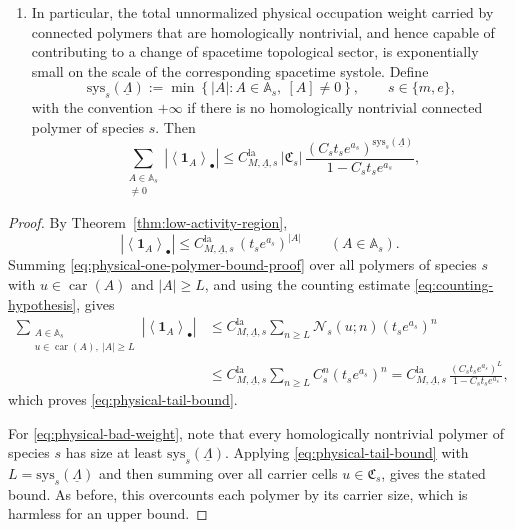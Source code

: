 \begin{corollary}
\begin{enumerate}[label=(\roman*)]
		\item\label{corItem:homological-tail}
		In particular, the total unnormalized physical occupation weight carried by connected
		polymers that are homologically nontrivial, and hence capable of contributing to a
		change of spacetime topological sector, is exponentially small on the scale of the
		corresponding spacetime systole. Define
		\begin{equation}
			\mathrm{sys}_s(\underline\Lambda)
			:=
			\min\left\{
			|A|:
			A\in\mathbb A_s,\ [A]\neq 0
			\right\},
			\qquad s\in\{m,e\},
			\label{eq:systole}
		\end{equation}
		with the convention \(+\infty\) if there is no homologically nontrivial connected
		polymer of species \(s\). Then
		\begin{equation}
			\sum_{\substack{A\in\mathbb A_s\\ [A]\neq 0}} \left|\left\langle \mathbf 1_A \right\rangle_\bullet\right|
			\le
			C_{M,\underline\Lambda,s}^{\mathrm{la}}\,
			|\mathfrak C_s|\,
			\frac{(C_s t_s e^{a_s})^{\mathrm{sys}_s(\underline\Lambda)}}
			{1-C_s t_s e^{a_s}},
			\label{eq:physical-bad-weight}
		\end{equation}
	\end{enumerate}
\end{corollary}

\begin{proof}
	By Theorem~\ref{thm:low-activity-region},
	\begin{equation}
		\left|
		\left\langle \mathbf 1_A \right\rangle_\bullet
		\right|
		\le
		C_{M,\underline\Lambda,s}^{\mathrm{la}}\,(t_s e^{a_s})^{|A|}
		\qquad
		(A\in\mathbb A_s).
		\label{eq:physical-one-polymer-bound-proof}
	\end{equation}
	Summing \eqref{eq:physical-one-polymer-bound-proof} over all polymers of species \(s\)
	with \(u\in\operatorname{car}(A)\) and \(|A|\ge L\), and using the counting estimate
	\eqref{eq:counting-hypothesis}, gives
	\begin{align}
		\sum_{\substack{A\in\mathbb A_s\\
				u\in\operatorname{car}(A),\ |A|\ge L}}
		\left|
		\left\langle \mathbf 1_A \right\rangle_\bullet
		\right|
		&\le
		C_{M,\underline\Lambda,s}^{\mathrm{la}}
		\sum_{n\ge L}
		\mathcal N_s(u;n)(t_s e^{a_s})^n
		\nonumber\\
		&\le
		C_{M,\underline\Lambda,s}^{\mathrm{la}}
		\sum_{n\ge L}
		C_s^n(t_s e^{a_s})^n
		=
		C_{M,\underline\Lambda,s}^{\mathrm{la}}\,
		\frac{(C_s t_s e^{a_s})^L}{1-C_s t_s e^{a_s}},
	\end{align}
	which proves \eqref{eq:physical-tail-bound}.
	
	For \eqref{eq:physical-bad-weight}, note that every homologically nontrivial polymer of
	species \(s\) has size at least \(\mathrm{sys}_s(\underline\Lambda)\). Applying
	\eqref{eq:physical-tail-bound} with \(L=\mathrm{sys}_s(\underline\Lambda)\) and then summing
	over all carrier cells \(u\in\mathfrak C_s\), gives the stated bound. As before, this
	overcounts each polymer by its carrier size, which is harmless for an upper bound.
\end{proof}



